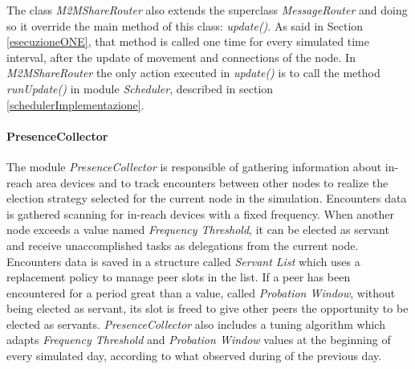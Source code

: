 The class \textit{M2MShareRouter} also extends the superclass \textit{MessageRouter} and doing so it override the main method of this class: \textit{update()}. As said in Section \ref{esecuzioneONE}, that method is called one time for every simulated time interval, after the update of movement and connections of the node. In \textit{M2MShareRouter} the only action executed in \textit{update()} is to call the method \textit{runUpdate()} in module \textit{Scheduler}, described in section \ref{schedulerImplementazione}.

\paragraph{PresenceCollector}
The module \textit{PresenceCollector} is responsible of gathering information about in-reach area devices and to track encounters between other nodes to realize the election strategy selected for the current node in the simulation. Encounters data is gathered scanning for in-reach devices with a fixed frequency. When another node exceeds a value named \textit{Frequency Threshold}, it can be elected as servant and receive unaccomplished tasks as delegations from the current node. Encounters data is saved in a structure called \textit{Servant List} which uses a replacement policy to manage peer slots in the list. If a peer has been encountered for a period great than a value, called \textit{Probation Window}, without being elected as servant, its slot is freed to give other peers the opportunity to be elected as servants. \textit{PresenceCollector} also includes a tuning algorithm which adapts \textit{Frequency Threshold} and \textit{Probation Window} values at the beginning of every simulated day, according to what observed during of the previous day.


